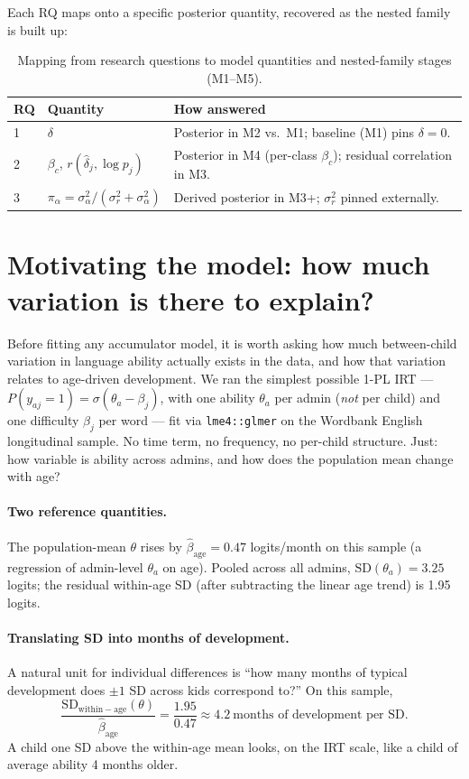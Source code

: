\documentclass[11pt]{article}
\begin{document}
Each RQ maps onto a specific posterior quantity, recovered as the
nested family is built up:

\begin{table}[h]
\centering
\small
\begin{tabular}{@{}lll@{}}
\toprule
RQ & Quantity & How answered \\
\midrule
1 & \(\delta\) & Posterior in M2 vs.\ M1; baseline (M1) pins \(\delta=0\). \\
2 & \(\beta_c\), \(r(\hat\delta_j, \log p_j)\) &
  Posterior in M4 (per-class \(\beta_c\)); residual correlation in M3. \\
3 & \(\pi_\alpha = \sigma_\alpha^2/(\sigma_r^2 + \sigma_\alpha^2)\) &
  Derived posterior in M3+; \(\sigma_r^2\) pinned externally. \\
\bottomrule
\end{tabular}
\caption{Mapping from research questions to model quantities and
nested-family stages (M1--M5).}
\label{tab:rq-map}
\end{table}

\section{Motivating the model: how much variation is there to explain?}
\label{sec:precursor}

Before fitting any accumulator model, it is worth asking how much
between-child variation in language ability actually exists in the
data, and how that variation relates to age-driven development. We
ran the simplest possible 1-PL IRT —
\(P(y_{aj} = 1) = \sigma(\theta_a - \beta_j)\), with one ability
\(\theta_a\) per admin (\emph{not} per child) and one difficulty
\(\beta_j\) per word — fit via \texttt{lme4::glmer} on the Wordbank
English longitudinal sample. No time term, no frequency, no per-child
structure. Just: how variable is ability across admins, and how does
the population mean change with age?

\paragraph{Two reference quantities.} The population-mean
\(\theta\) rises by \(\hat \beta_{\mathrm{age}} = 0.47\) logits/month
on this sample (a regression of admin-level \(\theta_a\) on age).
Pooled across all admins, \(\mathrm{SD}(\theta_a) = 3.25\) logits;
the residual within-age SD (after subtracting the linear age trend)
is 1.95 logits.

\paragraph{Translating SD into months of development.} A natural
unit for individual differences is ``how many months of typical
development does \(\pm 1\) SD across kids correspond to?'' On this
sample,
\[
\frac{\mathrm{SD}_{\mathrm{within-age}}(\theta)}
     {\hat \beta_{\mathrm{age}}}
= \frac{1.95}{0.47}
\approx 4.2~\text{months of development per SD}.
\]
A child one SD above the within-age mean looks, on the IRT scale,
like a child of average ability 4 months older.
\end{document}
